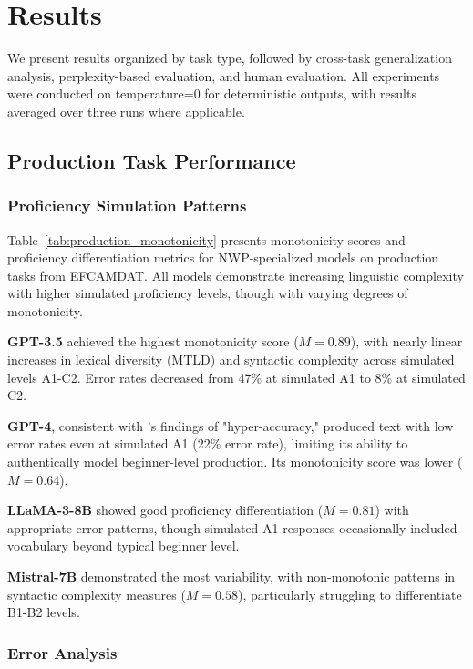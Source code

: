 \section{Results}

We present results organized by task type, followed by cross-task generalization analysis, perplexity-based evaluation, and human evaluation. All experiments were conducted on temperature=0 for deterministic outputs, with results averaged over three runs where applicable.

\subsection{Production Task Performance}

\subsubsection{Proficiency Simulation Patterns}

Table~\ref{tab:production_monotonicity} presents monotonicity scores and proficiency differentiation metrics for NWP-specialized models on production tasks from EFCAMDAT. All models demonstrate increasing linguistic complexity with higher simulated proficiency levels, though with varying degrees of monotonicity.



\textbf{GPT-3.5} achieved the highest monotonicity score ($M = 0.89$), with nearly linear increases in lexical diversity (MTLD) and syntactic complexity across simulated levels A1-C2. Error rates decreased from 47\% at simulated A1 to 8\% at simulated C2.

\textbf{GPT-4}, consistent with \citet{benedetto2024using}'s findings of "hyper-accuracy," produced text with low error rates even at simulated A1 (22\% error rate), limiting its ability to authentically model beginner-level production. Its monotonicity score was lower ($M = 0.64$).

\textbf{LLaMA-3-8B} showed good proficiency differentiation ($M = 0.81$) with appropriate error patterns, though simulated A1 responses occasionally included vocabulary beyond typical beginner level.

\textbf{Mistral-7B} demonstrated the most variability, with non-monotonic patterns in syntactic complexity measures ($M = 0.58$), particularly struggling to differentiate B1-B2 levels.

\subsubsection{Error Analysis}

